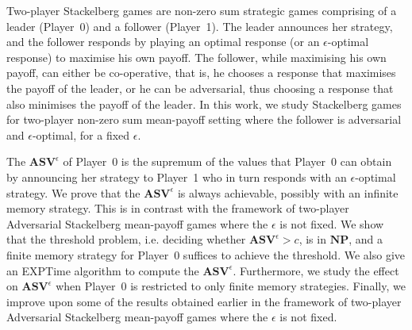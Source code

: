 Two-player Stackelberg games are non-zero sum strategic games comprising of a leader (Player~0) and a follower (Player~1). The leader announces her strategy, and the follower responds by playing an optimal response (or an $\epsilon$-optimal response) to maximise his own payoff. The follower, while maximising his own payoff, can either be co-operative, that is, he chooses a response that maximises the payoff of the leader, or he can be adversarial, thus choosing a response that also minimises the payoff of the leader. In this work, we study Stackelberg games for two-player non-zero sum mean-payoff setting where the follower is adversarial and $\epsilon$-optimal, for a fixed $\epsilon$.

The $\mathbf{ASV}^{\epsilon}$ of Player~0 is the supremum of the values that Player~0 can obtain by announcing her strategy to Player~1 who in turn responds with an $\epsilon$-optimal strategy.
We prove that the $\mathbf{ASV}^{\epsilon}$ is always achievable, possibly with an infinite memory strategy.
This is in contrast with the framework of two-player Adversarial Stackelberg mean-payoff games where the $\epsilon$ is not fixed.
We show that the threshold problem, i.e. deciding whether $\mathbf{ASV}^{\epsilon} > c$, is in $\textbf{NP}$, and a finite memory strategy for Player~0 suffices to achieve the threshold.
We also give an {\sf EXPTime} algorithm to compute the $\mathbf{ASV}^{\epsilon}$.
Furthermore, we study the effect on $\mathbf{ASV}^{\epsilon}$ when Player~0 is restricted to only finite memory strategies.
Finally, we improve upon some of the results obtained earlier in the framework of two-player Adversarial Stackelberg mean-payoff games where the $\epsilon$ is not fixed.
